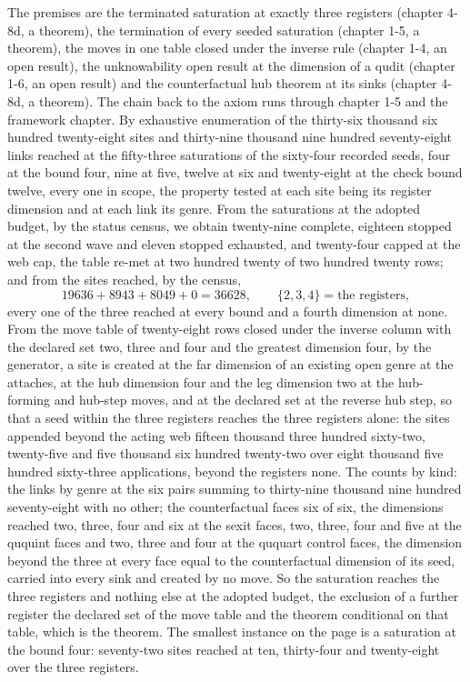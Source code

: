 \begin{chproof}
The premises are the terminated saturation at exactly three registers (chapter 4-8d, a theorem), the termination of every seeded saturation (chapter 1-5, a theorem), the moves in one table closed under the inverse rule (chapter 1-4, an open result), the unknowability open result at the dimension of a qudit (chapter 1-6, an open result) and the counterfactual hub theorem at its sinks (chapter 4-8d, a theorem). The chain back to the axiom runs through chapter 1-5 and the framework chapter. By exhaustive enumeration of the thirty-six thousand six hundred twenty-eight sites and thirty-nine thousand nine hundred seventy-eight links reached at the fifty-three saturations of the sixty-four recorded seeds, four at the bound four, nine at five, twelve at six and twenty-eight at the check bound twelve, every one in scope, the property tested at each site being its register dimension and at each link its genre. From the saturations at the adopted budget, by the status census, we obtain twenty-nine complete, eighteen stopped at the second wave and eleven stopped exhausted, and twenty-four capped at the web cap, the table re-met at two hundred twenty of two hundred twenty rows; and from the sites reached, by the census,
\begin{equation}
19636 + 8943 + 8049 + 0 = 36628 , \qquad \{2, 3, 4\} = \text{the registers} ,
\end{equation}
every one of the three reached at every bound and a fourth dimension at none. From the move table of twenty-eight rows closed under the inverse column with the declared set two, three and four and the greatest dimension four, by the generator, a site is created at the far dimension of an existing open genre at the attaches, at the hub dimension four and the leg dimension two at the hub-forming and hub-step moves, and at the declared set at the reverse hub step, so that a seed within the three registers reaches the three registers alone: the sites appended beyond the acting web fifteen thousand three hundred sixty-two, twenty-five and five thousand six hundred twenty-two over eight thousand five hundred sixty-three applications, beyond the registers none. The counts by kind: the links by genre at the six pairs summing to thirty-nine thousand nine hundred seventy-eight with no other; the counterfactual faces six of six, the dimensions reached two, three, four and six at the sexit faces, two, three, four and five at the ququint faces and two, three and four at the ququart control faces, the dimension beyond the three at every face equal to the counterfactual dimension of its seed, carried into every sink and created by no move. So the saturation reaches the three registers and nothing else at the adopted budget, the exclusion of a further register the declared set of the move table and the theorem conditional on that table, which is the theorem. The smallest instance on the page is a saturation at the bound four: seventy-two sites reached at ten, thirty-four and twenty-eight over the three registers.


\end{chproof}

